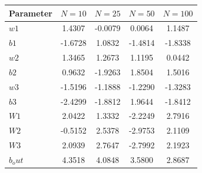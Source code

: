 \begin{tabular}{lcccc}
\hline
Parameter & $N=10$ & $N=25$ & $N=50$ & $N=100$ \\
\hline
$w1$ & 1.4307 & -0.0079 & 0.0064 & 1.1487 \\
$b1$ & -1.6728 & 1.0832 & -1.4814 & -1.8338 \\
$w2$ & 1.3465 & 1.2673 & 1.1195 & 0.0442 \\
$b2$ & 0.9632 & -1.9263 & 1.8504 & 1.5016 \\
$w3$ & -1.5196 & -1.1888 & -1.2290 & -1.3283 \\
$b3$ & -2.4299 & -1.8812 & 1.9644 & -1.8412 \\
$W1$ & 2.0422 & 1.3332 & -2.2249 & 2.7916 \\
$W2$ & -0.5152 & 2.5378 & -2.9753 & 2.1109 \\
$W3$ & 2.0939 & 2.7647 & -2.7992 & 2.1923 \\
$b_out$ & 4.3518 & 4.0848 & 3.5800 & 2.8687 \\
\hline
\end{tabular}
